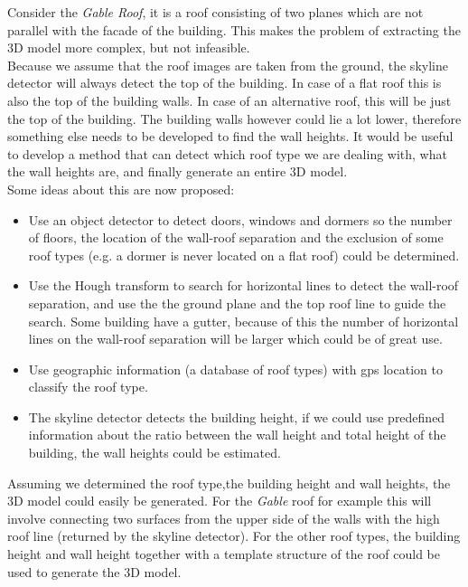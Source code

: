 Consider the \emph{Gable Roof}, it is a roof consisting of two planes
which are not parallel with the facade of the building. This makes the problem
of extracting the 3D model more complex, but not infeasible. \\
Because we assume that the roof images are taken from the ground, the skyline
detector will always detect the top of the building. In case of a flat roof
this is also the top of the building walls. In case of an
alternative roof, this will be just the top of the building. The building walls however
could lie a lot lower, therefore something else needs to be developed to find the wall
heights. It would be useful to develop a method that can detect which roof type we
are dealing with, what the wall heights are, and finally generate an entire 3D
model.\\
Some ideas about this are now proposed:\\
\begin{itemize}
	\item Use an object detector to detect doors, windows and dormers so the 
	number of floors, the location of the wall-roof separation and the exclusion of
	some roof types (e.g. a dormer is never located on a flat roof) could be determined.\\
	\item Use the Hough transform to search for horizontal lines to detect the
	wall-roof separation, and use the the ground plane and the top roof line to
	guide the search.  Some building have a gutter, because of this the number
	of horizontal lines on the wall-roof separation will be larger which could
	be of great use.\\
	\item Use geographic information (a database of roof types) with gps location
	to classify the roof type. \\
	\item The skyline detector detects the building height, if we
	could use predefined information about the ratio between the wall height and
	total height of the building, the wall heights could be estimated.\\
\end{itemize}
Assuming we determined the roof type,the building height and wall heights, the 3D model could 
easily be generated. For the \emph{Gable} roof for example this will involve
connecting two surfaces from the upper side of the walls with the high roof line (returned by the
skyline detector). For the other roof types, the building height and wall
height together with a template structure of the roof could be used to generate the 3D
model.



